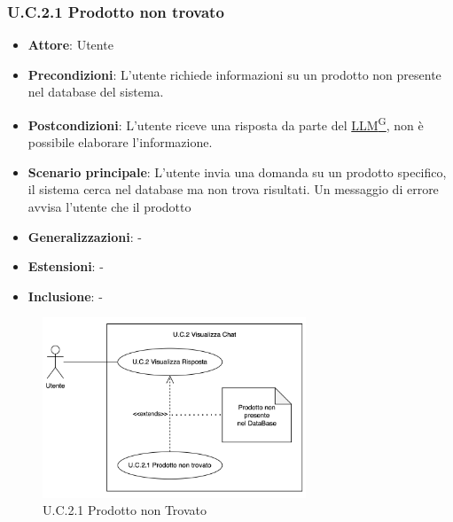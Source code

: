 \subsubsection{U.C.2.1 Prodotto non trovato}
\begin{itemize}
    \item \textbf{Attore}: Utente
    \item \textbf{Precondizioni}: L'utente richiede informazioni su un prodotto non presente nel database del sistema.
    \item \textbf{Postcondizioni}: L'utente riceve una risposta da parte del \href{https://code7crusaders.github.io/docs/RTB/documentazione_interna/glossario.html#llm-large-language-model}{LLM\textsuperscript{G}}, non è possibile elaborare l'informazione.
    \item \textbf{Scenario principale}: L'utente invia una domanda su un prodotto specifico, il sistema cerca nel database ma non trova risultati. Un messaggio di errore avvisa l'utente che il prodotto 
    \item \textbf{Generalizzazioni}: -
    \item \textbf{Estensioni}: -
    \item \textbf{Inclusione}: -
\end{itemize}
\begin{figure}[H]
    \centering
    \includegraphics[width=0.7\textwidth]{img/UC2.1.png}
    \caption{U.C.2.1 Prodotto non Trovato}
\end{figure}
\newpage
 
